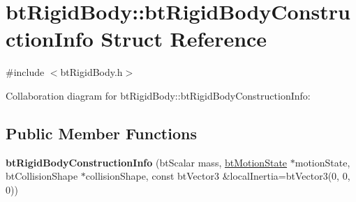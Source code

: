\hypertarget{structbt_rigid_body_1_1bt_rigid_body_construction_info}{\section{bt\+Rigid\+Body\+:\+:bt\+Rigid\+Body\+Construction\+Info Struct Reference}
\label{structbt_rigid_body_1_1bt_rigid_body_construction_info}
}


{\ttfamily \#include $<$bt\+Rigid\+Body.\+h$>$}



Collaboration diagram for bt\+Rigid\+Body\+:\+:bt\+Rigid\+Body\+Construction\+Info\+:
\subsection*{Public Member Functions}
\begin{DoxyCompactItemize}
\item 
\hypertarget{structbt_rigid_body_1_1bt_rigid_body_construction_info_a3415546c0299c88261e1951193c073d0}{{\bfseries bt\+Rigid\+Body\+Construction\+Info} (bt\+Scalar mass, \hyperlink{classbt_motion_state}{bt\+Motion\+State} $\ast$motion\+State, bt\+Collision\+Shape $\ast$collision\+Shape, const bt\+Vector3 \&local\+Inertia=bt\+Vector3(0, 0, 0))}\label{structbt_rigid_body_1_1bt_rigid_body_construction_info_a3415546c0299c88261e1951193c073d0}

\end{DoxyCompactItemize}
